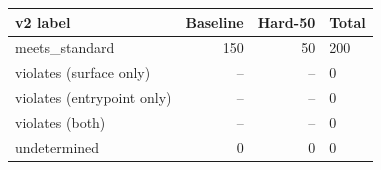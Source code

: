 \begin{tabular}{lrrl}
\toprule
\textbf{v2 label} & \textbf{Baseline} & \textbf{Hard-50} & \textbf{Total} \\
\midrule
meets\_standard & 150 & 50 & 200 \\
violates (surface only) & -- & -- & 0 \\
violates (entrypoint only) & -- & -- & 0 \\
violates (both) & -- & -- & 0 \\
undetermined & 0 & 0 & 0 \\
\bottomrule
\end{tabular}
